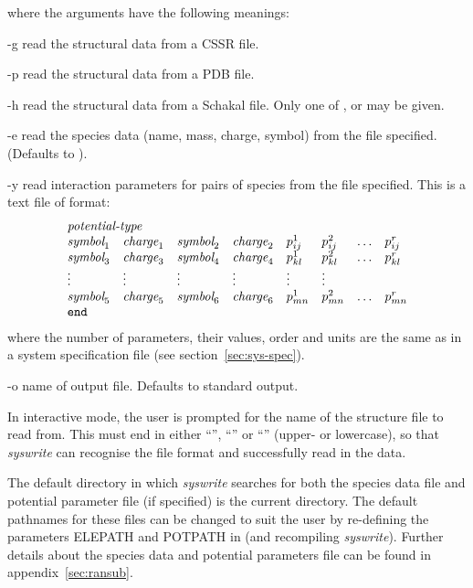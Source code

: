 \documentclass[a4paper,twoside]{report}
\begin{document}
where the arguments have the following meanings:
\begin{Argdescription}
\item[-g] read the structural data from a CSSR file.
\item[-p] read the structural data from a PDB file.
\item[-h] read the structural data from a Schakal file. Only one of ,
 or  may be given.
\item[-e] read the species data (name, mass, charge, symbol) from the file
specified. (Defaults to ).
\item[-y] read interaction parameters for pairs of species
from the file specified. This is a text file of format:
\begin{displaymath}
\begin{array}{llllllll}
\multicolumn{4}{l}{\textit{potential-type}} \\
\textit{symbol}_1 & \textit{charge}_1 & \textit{symbol}_2 & \textit{charge}_2
 & p^{1}_{ij} & p^{2}_{ij} & \ldots & p^{r}_{ij}  \\
\textit{symbol}_3 & \textit{charge}_3 & \textit{symbol}_4 & \textit{charge}_4
 & p^{1}_{kl} & p^{2}_{kl} & \ldots & p^{r}_{kl}  \\
\vdots & \vdots & \vdots & \vdots & \vdots & \vdots \\
\textit{symbol}_5 & \textit{charge}_5 & \textit{symbol}_6 & \textit{charge}_6
 & p^{1}_{mn} & p^{2}_{mn} & \ldots & p^{r}_{mn}  \\
\Lit{end} \\
\end{array}
\end{displaymath}
where the number of parameters, their values, order and units are the same
as in a system specification file (see section~\ref{sec:sys-spec}).
\item[-o] name of output file. Defaults to standard output.
\end{Argdescription}

In interactive mode, the user is prompted for the name of the structure
file to read from. This must end in either ``'', ``''
or ``'' (upper- or lowercase), so that \emph{syswrite} can
recognise the file format and successfully read in the data.

The default directory in which \emph{syswrite} searches for both the
species data file and potential parameter file (if specified) is the
current directory. The default pathnames for these
files can be changed to suit the user by re-defining the
parameters ELEPATH and POTPATH in  (and
recompiling \emph{syswrite}). Further details about the species data
and potential parameters file can be found in appendix~\ref{sec:ransub}.
\end{document}
